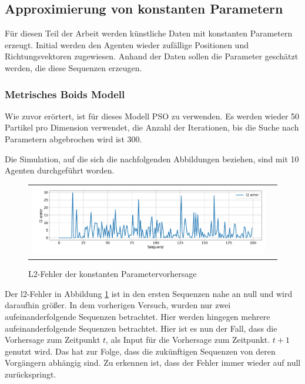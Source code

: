 \subsection{Approximierung von konstanten Parametern}\label{AVKP}


Für diesen Teil der Arbeit werden künstliche Daten mit konstanten Parametern erzeugt.
Initial werden den Agenten wieder zufällige Positionen und Richtungsvektoren zugewiesen. Anhand der Daten sollen die Parameter geschätzt werden, die diese Sequenzen erzeugen.

\subsubsection{Metrisches Boids Modell}

Wie zuvor erörtert, ist für dieses Modell PSO zu verwenden. Es werden wieder 50 Partikel pro Dimension verwendet, die Anzahl der Iterationen, bis die Suche nach Parametern abgebrochen wird ist 300.


Die Simulation, auf die sich die nachfolgenden Abbildungen beziehen, sind mit 10 Agenten durchgeführt worden.
\begin{figure}[H]
\centering
\begin{tabular}{cc}
\includegraphics[width=1.0\textwidth]{figures/Experimente/10Fisch/l2error_StatischeParameter.png} 
\end{tabular}
\caption{L2-Fehler der konstanten Parametervorhersage \label{fig:l2errorBoids10FischeStatisch}}
\end{figure}

Der l2-Fehler in Abbildung \ref{fig:l2errorBoids10FischeStatisch} ist in den ersten Sequenzen nahe an null und wird daraufhin größer. In dem vorherigen Versuch, wurden nur zwei aufeinanderfolgende Sequenzen betrachtet. Hier werden hingegen mehrere aufeinanderfolgende Sequenzen betrachtet. Hier ist es nun der Fall, dass die Vorhersage zum Zeitpunkt $t$, als Input für die Vorhersage zum Zeitpunkt. $t+1$ genutzt wird. Das hat zur Folge, dass die zukünftigen Sequenzen von deren Vorgängern abhängig sind. 
Zu erkennen ist, dass der Fehler immer wieder auf null zurückspringt.

